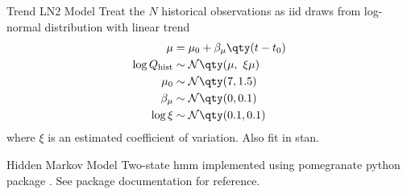 \documentclass[
  10pt,     %
  handout   %
]{beamer}
\newcommand{\normal}{\mathcal{N}}
\begin{document}
\begin{frame}{Trend LN2 Model}
  Treat the $N$ historical observations as \gls{iid} draws from log-normal distribution with linear trend
  \begin{align}\label{eq:ln2-trend}
    \begin{split}
      \mu &= \mu_0 + \beta_\mu \qty(t - t_0) \\
    \log Q_\text{hist} & \sim \normal \qty(\mu, \ \xi \mu) \\
    \mu_0 & \sim \normal \qty(7, 1.5) \\
    \beta_\mu & \sim \normal \qty(0, 0.1) \\
    \log \xi & \sim \normal \qty(0.1, 0.1)
    \end{split}
  \end{align}
  where $\xi$ is an estimated coefficient of variation.
  Also fit in stan.
\end{frame}

\begin{frame}{Hidden Markov Model}
  Two-state \gls{hmm} \citep[see][]{Rabiner:1986jk} implemented using pomegranate python package \citep{Schreiber:2017tg}.
  See package documentation for reference.
\end{frame}
\end{document}
